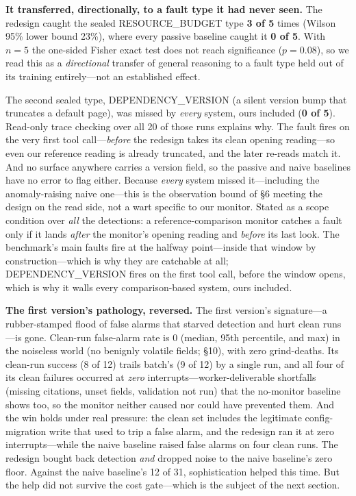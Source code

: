 \documentclass[acmsmall,screen]{acmart}
\begin{document}
\textbf{It transferred, directionally, to a fault type it had never seen.} The
redesign caught the sealed RESOURCE\_BUDGET type \textbf{3 of 5} times (Wilson
95\% lower bound 23\%), where every passive baseline caught it \textbf{0 of 5}.
With $n=5$ the one-sided Fisher exact test does not reach significance
($p=0.08$), so we read this as a \emph{directional} transfer of general reasoning
to a fault type held out of its training entirely---not an established effect.

The second sealed type, DEPENDENCY\_VERSION (a silent version bump that
truncates a default page), was missed by \emph{every} system, ours included
(\textbf{0 of 5}). Read-only trace checking over all 20 of those runs explains
why. The fault fires on the very first tool call---\emph{before} the redesign
takes its clean opening reading---so even our reference reading is already
truncated, and the later re-reads match it. And no surface anywhere carries a
version field, so the passive and naive baselines have no error to flag either.
Because \emph{every} system missed it---including the anomaly-raising naive
one---this is the observation bound of \S6 meeting the design on the read side,
not a wart specific to our monitor. Stated as a scope condition over \emph{all}
the detections: a reference-comparison monitor catches a fault only if it lands
\emph{after} the monitor's opening reading and \emph{before} its last look. The
benchmark's main faults fire at the halfway point---inside that window by
construction---which is why they are catchable at all; DEPENDENCY\_VERSION fires
on the first tool call, before the window opens, which is why it walls every
comparison-based system, ours included.

\textbf{The first version's pathology, reversed.} The first version's
signature---a rubber-stamped flood of false alarms that starved detection and
hurt clean runs---is gone. Clean-run false-alarm rate is 0 (median, 95th
percentile, and max) in the noiseless world (no benignly volatile fields; \S10),
with zero grind-deaths. Its clean-run success (8 of 12)
trails batch's (9 of 12) by a single run, and all four of its clean failures
occurred at \emph{zero} interrupts---worker-deliverable shortfalls (missing
citations, unset fields, validation not run) that the no-monitor baseline shows
too, so the monitor neither caused nor could have prevented them. And the win
holds under real
pressure: the clean set includes the legitimate config-migration write that used
to trip a false alarm, and the redesign ran it at zero interrupts---while the
naive baseline raised false alarms on four clean runs. The redesign bought back
detection \emph{and} dropped noise to the naive baseline's zero floor. Against
the naive baseline's 12 of 31, sophistication helped this time. But the help did
not survive the cost gate---which is the subject of the next section.
\end{document}
